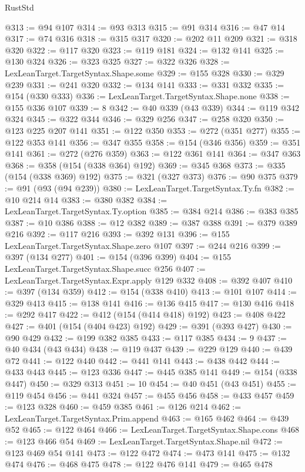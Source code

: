 \begin{lexlean}{RustStd}
\begin{coremodule}
{\begin{coremodule}
{{{{{{{{{{{{{{{{{{{{{{{{{{{{{{{{{{{{{{{{{{{{{{{@313 := @94 @107
@314 := @93 @313
@315 := @91 @314
@316 := @47 @14
@317 := @74 @316
@318 := @315 @317
@320 := @202 @11 @209
@321 := @318 @320
@322 := @117 @320
@323 := @119 @181
@324 := @132 @141
@325 := @130 @324
@326 := @323 @325
@327 := @322 @326
@328 := LexLeanTarget.TargetSyntax.Shape.some
@329 := @155 @328
@330 := @329 @239
@331 := @241 @320
@332 := @134 @141
@333 := @331 @332
@335 := @154 (@330 @333)
@336 := LexLeanTarget.TargetSyntax.Shape.none
@338 := @155 @336 @107
@339 := 8
@342 := @40 @339 (@43 @339)
@344 := @119 @342 @324
@345 := @322 @344
@346 := @329 @256
@347 := @258 @320
@350 := @123 @225 @207 @141
@351 := @122 @350
@353 := @272 (@351 @277)
@355 := @122 @353 @141
@356 := @347 @355
@358 := @154 (@346 @356)
@359 := @351 @141
@361 := @272 (@276 @359)
@363 := @122 @361 @141
@364 := @347 @363
@368 := @358 (@154 (@338 @364) @192)
@369 := @345 @368
@373 := @335 (@154 (@338 @369) @192)
@375 := @321 (@327 @373)
@376 := @90 @375
@379 := @91 (@93 (@94 @239))
@380 := LexLeanTarget.TargetSyntax.Ty.fn
@382 := @10 @214 @14
@383 := @380 @382
@384 := LexLeanTarget.TargetSyntax.Ty.option
@385 := @384 @214
@386 := @383 @385
@387 := @10 @386
@388 := @12 @382
@389 := @387 @388
@391 := @379 @389 @216
@392 := @117 @216
@393 := @392 @131
@396 := @155 LexLeanTarget.TargetSyntax.Shape.zero @107
@397 := @244 @216
@399 := @397 (@134 @277)
@401 := @154 (@396 @399)
@404 := @155 LexLeanTarget.TargetSyntax.Shape.succ @256
@407 := LexLeanTarget.TargetSyntax.Expr.apply @129 @332
@408 := @392 @407
@410 := @397 (@134 @359)
@412 := @154 (@338 @410)
@413 := @101 @107
@414 := @329 @413
@415 := @138 @141
@416 := @136 @415
@417 := @130 @416
@418 := @292 @417
@422 := @412 (@154 (@414 @418) @192)
@423 := @408 @422
@427 := @401 (@154 (@404 @423) @192)
@429 := @391 (@393 @427)
@430 := @90 @429
@432 := @199 @382 @385
@433 := @117 @385
@434 := 9
@437 := @40 @434 (@43 @434)
@438 := @119 @437
@439 := @229 @129
@440 := @439 @72
@441 := @122 @440
@442 := @441 @141
@443 := @438 @442
@444 := @433 @443
@445 := @123 @336
@447 := @445 @385 @141
@449 := @154 (@338 @447)
@450 := @329 @313
@451 := 10
@454 := @40 @451 (@43 @451)
@455 := @119 @454
@456 := @441 @324
@457 := @455 @456
@458 := @433 @457
@459 := @123 @328
@460 := @459 @385
@461 := @126 @214
@462 := LexLeanTarget.TargetSyntax.Prim.append
@463 := @165 @462
@464 := @439 @52
@465 := @122 @464
@466 := LexLeanTarget.TargetSyntax.Shape.cons
@468 := @123 @466 @54
@469 := LexLeanTarget.TargetSyntax.Shape.nil
@472 := @123 @469 @54 @141
@473 := @122 @472
@474 := @473 @141
@475 := @132 @474
@476 := @468 @475
@478 := @122 @476 @141
@479 := @465 @478
}}}}}}}}}}}}}}}}}}}}}}}}}}}}}}}}}}}}}}}}}}}}}}}
\end{coremodule}}
\end{coremodule}
\end{lexlean}
